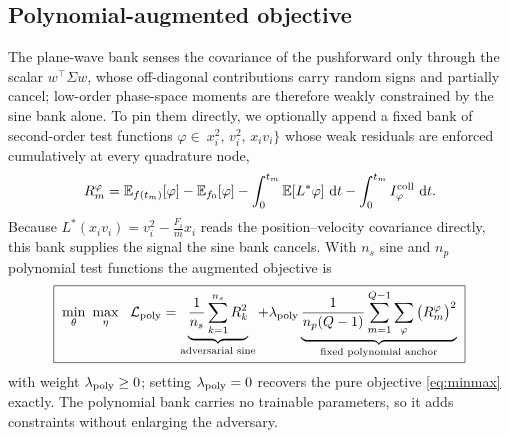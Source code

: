 \documentclass[11pt]{article}
\newcommand{\dd}{\,\mathrm{d}}
\newcommand{\E}{\mathbb{E}}
\theoremstyle{plain}
\begin{document}
\subsection{Polynomial-augmented objective}
\label{sec:poly_obj}
The plane-wave bank senses the covariance of the pushforward only through the scalar $w^\top\Sigma w$, whose off-diagonal contributions carry random signs and partially cancel; low-order phase-space moments are therefore weakly constrained by the sine bank alone. To pin them directly, we optionally append a fixed bank of second-order test functions $\varphi\in\ x_i^2,\,v_i^2,\,x_iv_i\}$ whose weak residuals are enforced  cumulatively at every quadrature node,
\begin{equation}
R^{\varphi}_m=\E_{f(t_m)}[\varphi]-\E_{f_0}[\varphi]-\int_0^{t_m}\E[L^\ast\varphi]\,\dd t-\int_0^{t_m}I^{\rm coll}_\varphi\,\dd t .
\label{eq:poly_res}
\end{equation}
Because $L^\ast(x_iv_i)=v_i^2-\tfrac{F_i}{m}x_i$ reads the position--velocity covariance directly, this bank supplies
the signal the sine bank cancels. With $n_s$ sine and $n_p$ polynomial test functions the augmented objective is
\begin{equation}
\boxed{\;\min_\theta\ \max_\eta\ \
\mathcal L_{\rm poly}=\underbrace{\frac1{n_s}\sum_{k=1}^{n_s}R_k^2}_{\text{adversarial sine}}
+\lambda_{\rm poly}\underbrace{\frac1{n_p(Q-1)}\sum_{m=1}^{Q-1}\sum_{\varphi}\big(R^{\varphi}_m\big)^2}_{\text{fixed polynomial anchor}}\;}
\label{eq:minmax_poly}
\end{equation}
with weight $\lambda_{\rm poly}\ge0$; setting $\lambda_{\rm poly}=0$ recovers the pure objective \eqref{eq:minmax}
exactly. The polynomial bank carries no trainable parameters, so it adds constraints without enlarging the adversary.
\end{document}
